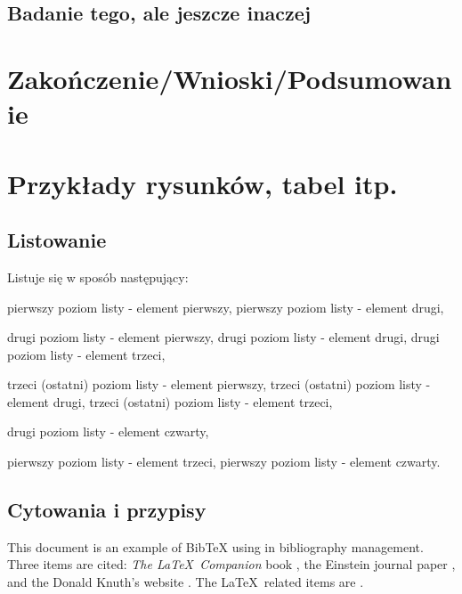 \subsection{Badanie tego, ale jeszcze inaczej}
\lipsum[1-3]

\section[Zakończenie]{Zakończenie/Wnioski/Podsumowanie}
\lipsum[1-8]

\newpage
\section[Przykłady]{Przykłady rysunków, tabel itp.}
\subsection{Listowanie}
Listuje się w sposób następujący:
\begin{itemize}
	\itemi pierwszy poziom listy - element pierwszy,
	\itemi pierwszy poziom listy - element drugi,
	\begin{itemize}
		\itemii drugi poziom listy - element pierwszy,
		\itemii drugi poziom listy - element drugi,
		\itemii drugi poziom listy - element trzeci,
		\begin{itemize}
			\itemiii trzeci (ostatni) poziom listy - element pierwszy,
			\itemiii trzeci (ostatni) poziom listy - element drugi,
			\itemiii trzeci (ostatni) poziom listy - element trzeci,
		\end{itemize}
		\itemii drugi poziom listy - element czwarty,
		\end{itemize}
	\itemi pierwszy poziom listy - element trzeci,
	\itemi pierwszy poziom listy - element czwarty.
\end{itemize}

\subsection{Cytowania i przypisy}
This document is an example of BibTeX using in bibliography management. Three items 
are cited: \textit{The \LaTeX\ Companion} book \cite{latexcompanion}, the Einstein
journal paper \cite{einstein}, and the Donald Knuth's website \cite{knuthwebsite}. 
The \LaTeX\ related items are \cite{latexcompanion,knuthwebsite}.\footnotemark[1]


